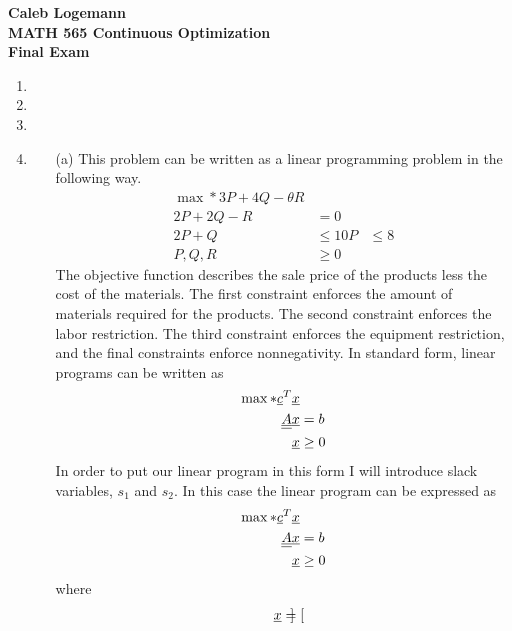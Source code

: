 \documentclass[11pt, oneside]{article}
\begin{document}
\noindent \textbf{\Large{Caleb Logemann \\
MATH 565 Continuous Optimization \\
Final Exam
}}

%
\begin{enumerate}
    \item %
      
    \item %
    \item %
    \item %
      \begin{enumerate}
        \item[(a)] %
          This problem can be written as a linear programming problem in the
          following way.
          \begin{align*}
            \max*{} 3P + 4Q - \theta R & \\
            2P + 2Q - R &= 0 \\
            2P + Q &\le 10
            P &\le 8 \\
            P, Q, R &\ge 0
          \end{align*}
          The objective function describes the sale price of the products less
          the cost of the materials.
          The first constraint enforces the amount of materials required for
          the products.
          The second constraint enforces the labor restriction.
          The third constraint enforces the equipment restriction, and the 
          final constraints enforce nonnegativity.
          In standard form, linear programs can be written as
          \begin{align*}
            \max*{} \underline{c}^T \underline{x} & \\
            \underline{\underline{A}} \underline{x} &= b \\
            \underline{x} &\ge 0
          \end{align*}
          In order to put our linear program in this form I will introduce
          slack variables, $s_1$ and $s_2$.
          In this case the linear program can be expressed as
          \begin{align*}
            \max*{} \underline{c}^T \underline{x} & \\
            \underline{\underline{A}} \underline{x} &= b \\
            \underline{x} &\ge 0
          \end{align*}
          where
          \begin{align*}
            \underline{x} =
            \begin{bmatrix}

\end{bmatrix}
\end{align*}
\end{enumerate}
\end{enumerate}
\end{document}
